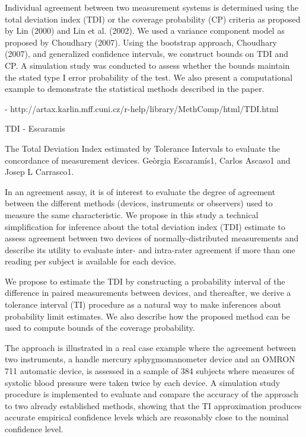 \documentclass[MAIN.tex]{subfiles}
\begin{document}
Individual agreement between two measurement systems is determined using the total deviation index (TDI) or the coverage probability (CP) criteria as proposed by Lin (2000) and Lin et al. (2002). We used a variance component model as proposed by Choudhary (2007). Using the bootstrap approach, Choudhary (2007), and generalized confidence intervals, we construct bounds on TDI and CP. A simulation study was conducted to assess whether the bounds maintain the stated type I error probability of the test. We also present a computational example to demonstrate the statistical methods described in the paper.

- http://artax.karlin.mff.cuni.cz/r-help/library/MethComp/html/TDI.html

\newpage
TDI - Escaramis

The Total Deviation Index estimated by Tolerance Intervals to evaluate the concordance of measurement devices.  
Geòrgia Escaramís1, Carlos Ascaso1 and Josep L Carrasco1.  

In an agreement assay, it is of interest to evaluate the degree of agreement between the different methods (devices, instruments or observers) used to measure the same characteristic. We propose in this study a technical simplification for inference about the total deviation index (TDI) estimate to assess agreement between two devices of normally-distributed measurements and describe its utility to evaluate inter- and intra-rater agreement if more than one reading per subject is available for each device.

We propose to estimate the TDI by constructing a probability interval of the difference in paired measurements between devices, and thereafter, we derive a tolerance interval (TI) procedure as a natural way to make inferences about probability limit estimates. We also describe how the proposed method can be used to compute bounds of the coverage probability.

The approach is illustrated in a real case example where the agreement between two instruments, a handle mercury sphygmomanometer device and an OMRON 711 automatic device, is assessed in a sample of 384 subjects where measures of systolic blood pressure were taken twice by each device. A simulation study procedure is implemented to evaluate and compare the accuracy of the approach to two already established methods, showing that the TI approximation produces accurate empirical confidence levels which are reasonably close to the nominal confidence level.
\end{document}
